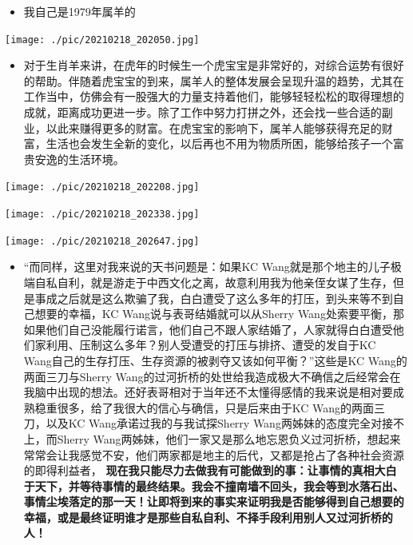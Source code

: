 \documentclass[9pt, b5paper]{article}
\begin{document}
\begin{itemize}
\begin{itemize}
\begin{itemize}
\item 我自己是1979年属羊的
\end{itemize}
\texttt{[image: ./pic/20210218\_202050.jpg]}
\begin{itemize}
\item 对于生肖羊来讲，在虎年的时候生一个虎宝宝是非常好的，对综合运势有很好的帮助。伴随着虎宝宝的到来，属羊人的整体发展会呈现升温的趋势，尤其在工作当中，仿佛会有一股强大的力量支持着他们，能够轻轻松松的取得理想的成就，距离成功更进一步。除了工作中努力打拼之外，还会找一些合适的副业，以此来赚得更多的财富。在虎宝宝的影响下，属羊人能够获得充足的财富，生活也会发生全新的变化，以后再也不用为物质所困，能够给孩子一个富贵安逸的生活环境。
\end{itemize}
\texttt{[image: ./pic/20210218\_202208.jpg]}

\texttt{[image: ./pic/20210218\_202338.jpg]}

\texttt{[image: ./pic/20210218\_202647.jpg]}

\begin{itemize}
\item “而同样，这里对我来说的天书问题是：如果KC Wang就是那个地主的儿子极端自私自利，就是游走于中西文化之离，故意利用我为他亲侄女谋了生存，但是事成之后就是这么欺骗了我，白白遭受了这么多年的打压，到头来等不到自己想要的幸福，KC Wang说与表哥结婚就可以从Sherry Wang处索要平衡，那如果他们自己没能履行诺言，他们自己不跟人家结婚了，人家就得白白遭受他们家利用、压制这么多年？别人受遭受的打压与排挤、遭受的发自于KC Wang自己的生存打压、生存资源的被剥夺又该如何平衡？”这些是KC Wang的两面三刀与Sherry Wang的过河折桥的处世给我造成极大不确信之后经常会在我脑中出现的想法。还好表哥相对于当年还不太懂得感情的我来说是相对要成熟稳重很多，给了我很大的信心与确信，只是后来由于KC Wang的两面三刀，以及KC Wang承诺过我的与我试探Sherry Wang两姊妹的态度完全对接不上，而Sherry Wang两姊妹，他们一家又是那么地忘恩负义过河折桥，想起来常常会让我感觉不安，他们两家都是地主的后代，又都是抢占了各种社会资源的即得利益者， \textbf{现在我只能尽力去做我有可能做到的事：让事情的真相大白于天下，并等待事情的最终结果。我会不撞南墙不回头，我会等到水落石出、事情尘埃落定的那一天！让即将到来的事实来证明我是否能够得到自己想要的幸福，或是最终证明谁才是那些自私自利、不择手段利用别人又过河折桥的人！}
\end{itemize}
\end{itemize}


\end{itemize}
\end{document}
